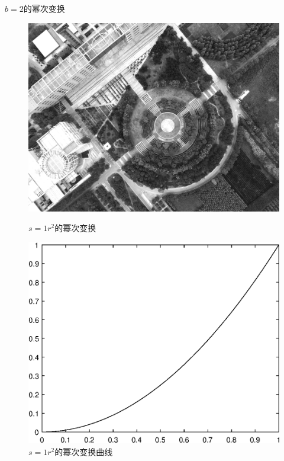 $b=2$的幂次变换
\begin{figure}[H]
	\centering
	\begin{minipage}{0.45\linewidth}
		\includegraphics[width=\linewidth]{figure/DJI_0027_Gamma_200.png}
		\caption{$s=1r^2$的幂次变换}
	\end{minipage}
	\begin{minipage}{0.45\linewidth}
		\includegraphics[width=\linewidth]{figure/DJI_0027_Gamma_200_Graph.eps}
		\caption{$s=1r^2$的幂次变换曲线}
	\end{minipage}
\end{figure}
